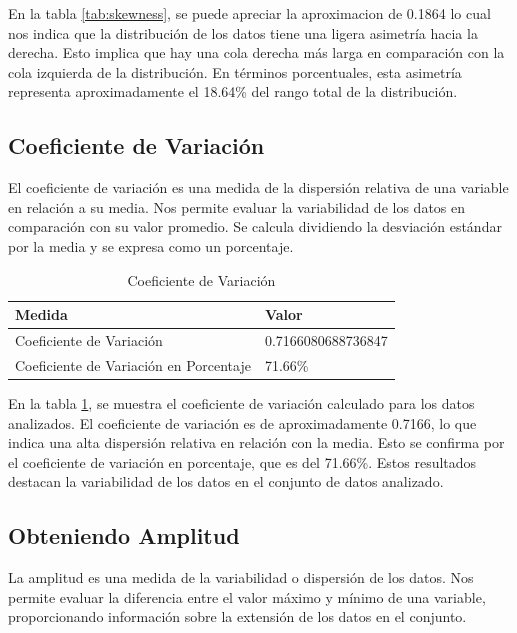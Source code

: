 En la tabla \ref{tab:skewness}, se puede apreciar la aproximacion de 0.1864 lo cual nos indica que la distribución de los datos tiene una
ligera asimetría hacia la derecha. Esto implica que hay una cola derecha más larga en comparación con la
cola izquierda de la distribución. En términos porcentuales, esta asimetría representa aproximadamente
el 18.64\% del rango total de la distribución.

\subsection{Coeficiente de Variación}

El coeficiente de variación es una medida de la dispersión relativa de una variable en relación a su media.
Nos permite evaluar la variabilidad de los datos en comparación con su valor promedio. Se calcula dividiendo
la desviación estándar por la media y se expresa como un porcentaje.

\begin{table}[htbp]
    \centering
    \caption{Coeficiente de Variación}
    \begin{tabular}{ll}
        \hline
        \textbf{Medida}                        & \textbf{Valor}     \\
        \hline
        Coeficiente de Variación               & 0.7166080688736847 \\
        \hline
        Coeficiente de Variación en Porcentaje & 71.66\%            \\
        \hline
    \end{tabular}
    \label{tab:coef_variacion}
\end{table}

En la tabla \ref{tab:coef_variacion}, se muestra el coeficiente de variación calculado para los
datos analizados. El coeficiente de variación es de aproximadamente 0.7166, lo que indica una alta
dispersión relativa en relación con la media. Esto se confirma por el coeficiente de variación en porcentaje,
que es del 71.66\%. Estos resultados destacan la variabilidad de los datos en el conjunto de datos analizado.

\subsection{Obteniendo Amplitud}

La amplitud es una medida de la variabilidad o dispersión de los datos. Nos permite evaluar la diferencia
entre el valor máximo y mínimo de una variable, proporcionando información sobre la extensión de los datos
en el conjunto.

